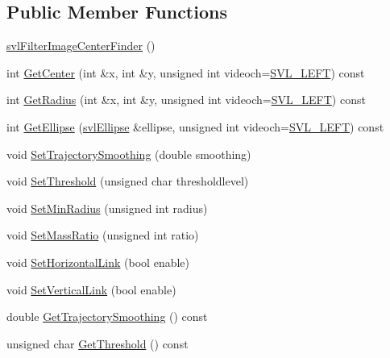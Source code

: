 \subsection*{Public Member Functions}
\begin{DoxyCompactItemize}
\item 
\hyperlink{classsvl_filter_image_center_finder_a37b91737e46cd550687116bdb2ab5aea}{svl\-Filter\-Image\-Center\-Finder} ()
\item 
int \hyperlink{classsvl_filter_image_center_finder_a62b674308e69dc341da21c9936cbce3a}{Get\-Center} (int \&x, int \&y, unsigned int videoch=\hyperlink{svl_definitions_8h_ab9fec7615f19c8df2919eebcab0b187f}{S\-V\-L\-\_\-\-L\-E\-F\-T}) const 
\item 
int \hyperlink{classsvl_filter_image_center_finder_a7b18bd54bfed4578908d1791118c51fe}{Get\-Radius} (int \&x, int \&y, unsigned int videoch=\hyperlink{svl_definitions_8h_ab9fec7615f19c8df2919eebcab0b187f}{S\-V\-L\-\_\-\-L\-E\-F\-T}) const 
\item 
int \hyperlink{classsvl_filter_image_center_finder_ace2664b59ca74314a0552cac25bf21cb}{Get\-Ellipse} (\hyperlink{structsvl_ellipse}{svl\-Ellipse} \&ellipse, unsigned int videoch=\hyperlink{svl_definitions_8h_ab9fec7615f19c8df2919eebcab0b187f}{S\-V\-L\-\_\-\-L\-E\-F\-T}) const 
\item 
void \hyperlink{classsvl_filter_image_center_finder_a99a74a776a5324e000cf8d2582baf11e}{Set\-Trajectory\-Smoothing} (double smoothing)
\item 
void \hyperlink{classsvl_filter_image_center_finder_a4969d25f2f52e0694dfda9dbf991ad8f}{Set\-Threshold} (unsigned char thresholdlevel)
\item 
void \hyperlink{classsvl_filter_image_center_finder_a83680965986de5cda60659a8c4397d19}{Set\-Min\-Radius} (unsigned int radius)
\item 
void \hyperlink{classsvl_filter_image_center_finder_a660622779cc64bfbf749a86622b5612f}{Set\-Mass\-Ratio} (unsigned int ratio)
\item 
void \hyperlink{classsvl_filter_image_center_finder_a15dfd1aac236158f34834f6f06305f54}{Set\-Horizontal\-Link} (bool enable)
\item 
void \hyperlink{classsvl_filter_image_center_finder_a8be260832a0f0ee53c061ed3e1d4b9db}{Set\-Vertical\-Link} (bool enable)
\item 
double \hyperlink{classsvl_filter_image_center_finder_a554f54d6ef5f361d153e875f86a4e611}{Get\-Trajectory\-Smoothing} () const 
\item 
unsigned char \hyperlink{classsvl_filter_image_center_finder_ac8826760dcd1bafafb27a6aa5046a42a}{Get\-Threshold} () const 

\end{DoxyCompactItemize}
